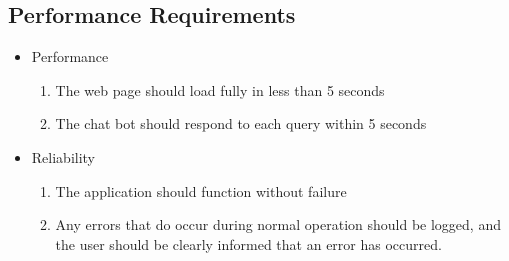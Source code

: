 \subsection{Performance Requirements}
\begin{itemize}
	\item Performance
	\begin{enumerate}[label*=P\arabic*.]
		\item The web page should load fully in less than 5 seconds
		\item The chat bot should respond to each query within 5 seconds
	\end{enumerate}
	\item Reliability
	\begin{enumerate}[resume*]
		\item The application should function without failure
		\item Any errors that do occur during normal operation should be logged, and the user should be clearly informed that an error has occurred.
	\end{enumerate}
\end{itemize}
